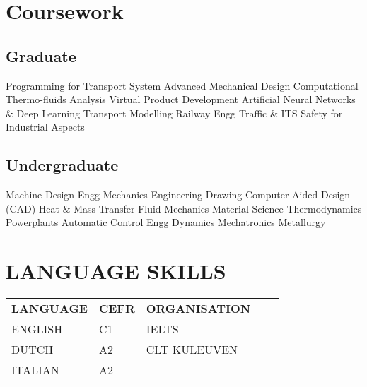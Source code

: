 \documentclass[]{hussain-resume-openfont}
\begin{document}
\begin{minipage}[t]{0.33\textwidth}
\section{Coursework}
\subsection{Graduate}
Programming for Transport System \textbullet{} Advanced Mechanical Design \textbullet{} Computational Thermo-fluids Analysis \textbullet{} Virtual Product Development \textbullet{} Artificial Neural Networks \& Deep Learning \textbullet{} Transport Modelling \textbullet{} Railway Engg \textbullet{} Traffic \& ITS \textbullet{} Safety for Industrial Aspects
\sectionsep

\subsection{Undergraduate}
Machine Design \textbullet{} Engg Mechanics \textbullet{} Engineering Drawing \textbullet{} Computer Aided Design (CAD) \textbullet{} Heat \& Mass Transfer \textbullet{} Fluid Mechanics \textbullet{} Material Science \textbullet{} Thermodynamics \textbullet{} Powerplants \textbullet{} Automatic Control \textbullet{} Engg Dynamics \textbullet{} Mechatronics \textbullet{} Metallurgy 
\sectionsep

\section{LANGUAGE SKILLS}
\begin{tabular}{lllll}
\textbf{LANGUAGE} & \textbf{CEFR}   & \textbf{ORGANISATION}  \\
 
ENGLISH & C1 & IELTS \\

DUTCH	& A2 & CLT KULEUVEN \\

ITALIAN & A2 &  

\end{tabular}
\end{minipage}

\newpage %
\end{document}
